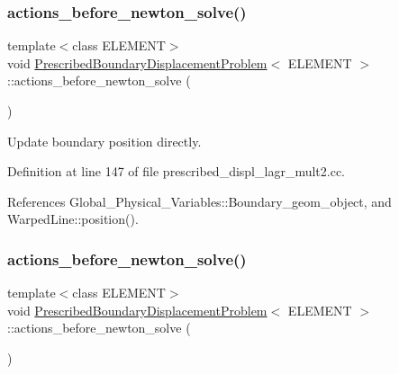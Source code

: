 \subsubsection{\texorpdfstring{actions\+\_\+before\+\_\+newton\+\_\+solve()}{actions\_before\_newton\_solve()}\hspace{0.1cm}{\footnotesize\ttfamily [1/3]}}
{\footnotesize\ttfamily template$<$class E\+L\+E\+M\+E\+NT$>$ \\
void \hyperlink{classPrescribedBoundaryDisplacementProblem}{Prescribed\+Boundary\+Displacement\+Problem}$<$ E\+L\+E\+M\+E\+NT $>$\+::actions\+\_\+before\+\_\+newton\+\_\+solve (\begin{DoxyParamCaption}{ }\end{DoxyParamCaption})\hspace{0.3cm}{\ttfamily [inline]}}



Update boundary position directly. 



Definition at line 147 of file prescribed\+\_\+displ\+\_\+lagr\+\_\+mult2.\+cc.



References Global\+\_\+\+Physical\+\_\+\+Variables\+::\+Boundary\+\_\+geom\+\_\+object, and Warped\+Line\+::position().

\mbox{\label{classPrescribedBoundaryDisplacementProblem_ad2184bb8d7391da21bec62d4aacf5c20}} 
\subsubsection{\texorpdfstring{actions\+\_\+before\+\_\+newton\+\_\+solve()}{actions\_before\_newton\_solve()}\hspace{0.1cm}{\footnotesize\ttfamily [2/3]}}
{\footnotesize\ttfamily template$<$class E\+L\+E\+M\+E\+NT$>$ \\
void \hyperlink{classPrescribedBoundaryDisplacementProblem}{Prescribed\+Boundary\+Displacement\+Problem}$<$ E\+L\+E\+M\+E\+NT $>$\+::actions\+\_\+before\+\_\+newton\+\_\+solve (\begin{DoxyParamCaption}{ }\end{DoxyParamCaption})\hspace{0.3cm}{\ttfamily [inline]}}



